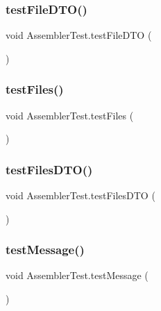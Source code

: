 \subsubsection{\texorpdfstring{test\+File\+D\+T\+O()}{testFileDTO()}}
{\footnotesize\ttfamily void Assembler\+Test.\+test\+File\+D\+TO (\begin{DoxyParamCaption}{ }\end{DoxyParamCaption})}

\mbox{\label{class_assembler_test_a538ca394aa395f0c635fed95507187c0}} 
\subsubsection{\texorpdfstring{test\+Files()}{testFiles()}}
{\footnotesize\ttfamily void Assembler\+Test.\+test\+Files (\begin{DoxyParamCaption}{ }\end{DoxyParamCaption})}

\mbox{\label{class_assembler_test_a22ab9ea501c253e4bc09ac802edc97d6}} 
\subsubsection{\texorpdfstring{test\+Files\+D\+T\+O()}{testFilesDTO()}}
{\footnotesize\ttfamily void Assembler\+Test.\+test\+Files\+D\+TO (\begin{DoxyParamCaption}{ }\end{DoxyParamCaption})}

\mbox{\label{class_assembler_test_afe32ecf0de7758e122ee4138ecaea21d}} 
\subsubsection{\texorpdfstring{test\+Message()}{testMessage()}}
{\footnotesize\ttfamily void Assembler\+Test.\+test\+Message (\begin{DoxyParamCaption}{ }\end{DoxyParamCaption})}

